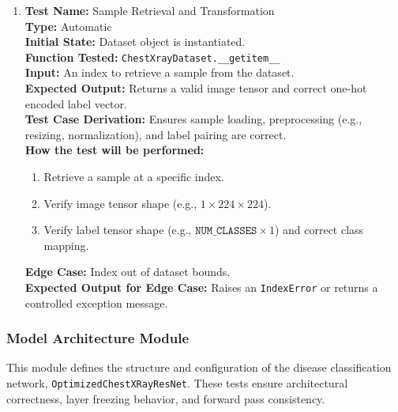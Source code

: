 \documentclass[12pt, titlepage]{article}
\begin{document}
\begin{enumerate}
  \item \textbf{Test Name:} Sample Retrieval and Transformation\\
    \textbf{Type:} Automatic\\
    \textbf{Initial State:} Dataset object is instantiated.\\
    \textbf{Function Tested:} \verb|ChestXrayDataset.__getitem__|\\
    \textbf{Input:} An index to retrieve a sample from the dataset.\\
    \textbf{Expected Output:} Returns a valid image tensor and correct one-hot encoded label vector.\\
    \textbf{Test Case Derivation:} Ensures sample loading, preprocessing (e.g., resizing, normalization), and label pairing are correct.\\
    \textbf{How the test will be performed:}
    \begin{enumerate}
      \item Retrieve a sample at a specific index.
      \item Verify image tensor shape (e.g., $1 \times 224 \times 224$).
      \item Verify label tensor shape (e.g., $\texttt{NUM\_CLASSES} \times 1$) and correct class mapping.
    \end{enumerate}
    \textbf{Edge Case:} Index out of dataset bounds.\\
    \textbf{Expected Output for Edge Case:} Raises an \verb|IndexError| or returns a controlled exception message.\\
\end{enumerate}

\subsubsection{Model Architecture Module}
This module defines the structure and configuration of the disease classification network, \verb|OptimizedChestXRayResNet|. These tests ensure architectural correctness, layer freezing behavior, and forward pass consistency.
\end{document}
